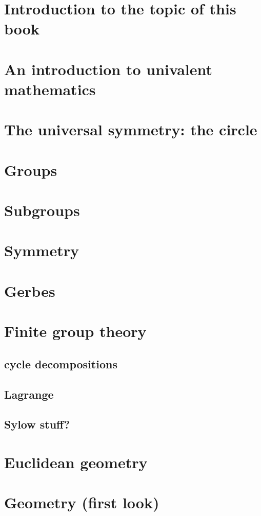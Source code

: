 \documentclass[a4,12pt]{amsbook}
\begin{document}

\chapter{Introduction to the topic of this book}

\chapter{An introduction to univalent mathematics}

\chapter{The universal symmetry: the circle}

\chapter{Groups}

\chapter{Subgroups}

\chapter{Symmetry}

\chapter{Gerbes}

\chapter{Finite group theory}

\section{cycle decompositions}
\section{Lagrange}
\section{Sylow stuff?}

\chapter{Euclidean geometry}


\chapter{Geometry (first look)}
\end{document}
